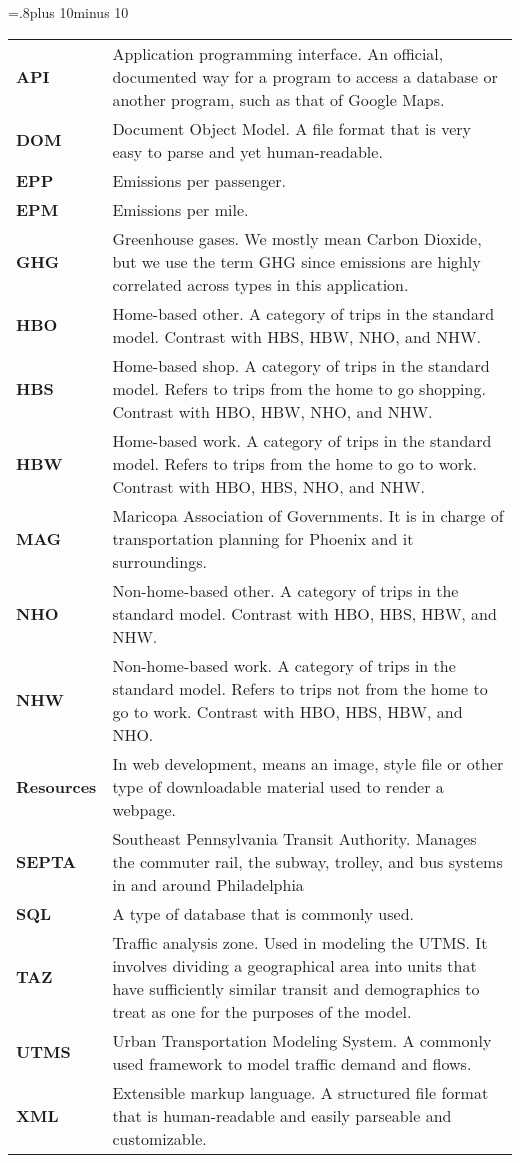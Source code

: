 
{\centering
\midcolumnwidth=.8\textwidth plus 10\tabcolsep minus 10\tabcolsep
\begin{tabular}{%
    >{\raggedright\bfseries}p{}%
    p{\midcolumnwidth}}
  API & Application programming interface. An official, documented way
  for a program to access a database or another program, such as that
  of Google Maps. \\
  DOM & Document Object Model. A file format that is very easy to
  parse and yet human-readable. \\
  EPP & Emissions per passenger. \\
  EPM & Emissions per mile. \\
  GHG & Greenhouse gases. We mostly mean Carbon Dioxide, but we use
  the term GHG since emissions are highly correlated across types in
  this application. \\
  HBO & Home-based other. A category of trips in the
  standard  model. Contrast with HBS, HBW, NHO, and NHW. \\
  HBS & Home-based shop. A category of trips in the standard
  model. Refers to trips from the home to go shopping. Contrast with
  HBO, HBW, NHO, and NHW. \\
  HBW & Home-based work. A category of trips in the standard
  model. Refers to trips from the home to go to work. Contrast with
  HBO, HBS, NHO, and NHW. \\
  MAG & Maricopa Association of Governments. It is in charge of
  transportation planning for Phoenix and it surroundings. \\
  NHO & Non-home-based other. A category of trips in the standard
  model. Contrast with  HBO, HBS, HBW, and NHW. \\
  NHW & Non-home-based work. A category of trips in the standard
  model. Refers to trips not from the home to go to work. Contrast
  with HBO, HBS, HBW, and NHO. \\
  Resources & In web development, means an image, style file or other
  type of downloadable material used to render a webpage. \\
  SEPTA & Southeast Pennsylvania Transit Authority. Manages the
  commuter rail, the subway, trolley, and bus systems in and around
  Philadelphia \\
  SQL & A type of database that is commonly used. \\
  TAZ & Traffic analysis zone. Used in modeling the UTMS. It involves
  dividing a geographical area into units that have sufficiently
  similar transit and demographics to treat as one for the purposes of
  the model. \\
  UTMS & Urban Transportation Modeling System. A commonly used
  framework to model traffic demand and flows. \\
  XML & Extensible markup language. A structured file format that is
  human-readable and easily parseable and customizable. \\
\end{tabular}
}